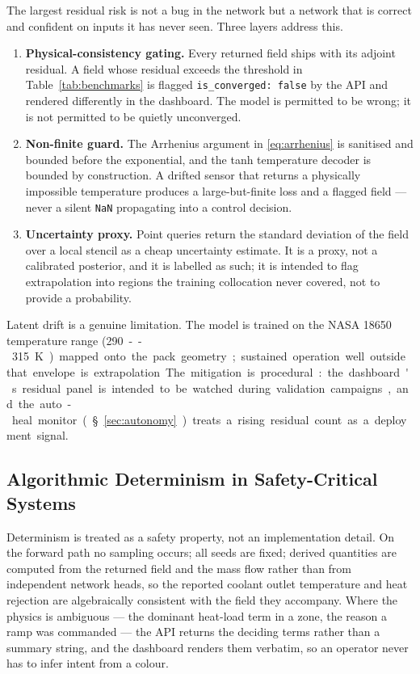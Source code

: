 \documentclass[journal,10pt,compsoc,onecolumn]{IEEEtran}
\begin{document}
\noindent
The largest residual risk is not a bug in the network but a network that is
correct and confident on inputs it has never seen. Three layers address this.

\begin{enumerate}[leftmargin=1.4em,itemsep=3pt,topsep=3pt]
\item \textbf{Physical-consistency gating.} Every returned field ships with its
      adjoint residual. A field whose residual exceeds the threshold in
      Table~\ref{tab:benchmarks} is flagged \texttt{is\_converged: false} by the
      API and rendered differently in the dashboard. The model is permitted to
      be wrong; it is not permitted to be quietly unconverged.
\item \textbf{Non-finite guard.} The Arrhenius argument in \eqref{eq:arrhenius}
      is sanitised and bounded before the exponential, and the tanh temperature
      decoder is bounded by construction. A drifted sensor that returns a
      physically impossible temperature produces a large-but-finite loss and a
      flagged field --- never a silent \texttt{NaN} propagating into a control
      decision.
\item \textbf{Uncertainty proxy.} Point queries return the standard deviation of
      the field over a local stencil as a cheap uncertainty estimate. It is a
      proxy, not a calibrated posterior, and it is labelled as such; it is
      intended to flag extrapolation into regions the training collocation never
      covered, not to provide a probability.
\end{enumerate}

\noindent
Latent drift is a genuine limitation. The model is trained on the NASA 18650
temperature range (\SI{290}--\SI{315}~\si{\kelvin}) mapped onto the pack
geometry; sustained operation well outside that envelope is extrapolation. The
mitigation is procedural: the dashboard's residual panel is intended to be
watched during validation campaigns, and the auto-heal monitor
(\S\ref{sec:autonomy}) treats a rising residual count as a deployment signal.

\subsection{Algorithmic Determinism in Safety-Critical Systems}
\label{sec:safety-determinism}

\noindent
Determinism is treated as a safety property, not an implementation detail. On
the forward path no sampling occurs; all seeds are fixed; derived quantities are
computed from the returned field and the mass flow rather than from independent
network heads, so the reported coolant outlet temperature and heat rejection are
algebraically consistent with the field they accompany. Where the physics is
ambiguous --- the dominant heat-load term in a zone, the reason a ramp was
commanded --- the API returns the deciding terms rather than a summary string,
and the dashboard renders them verbatim, so an operator never has to infer intent
from a colour.
\end{document}
